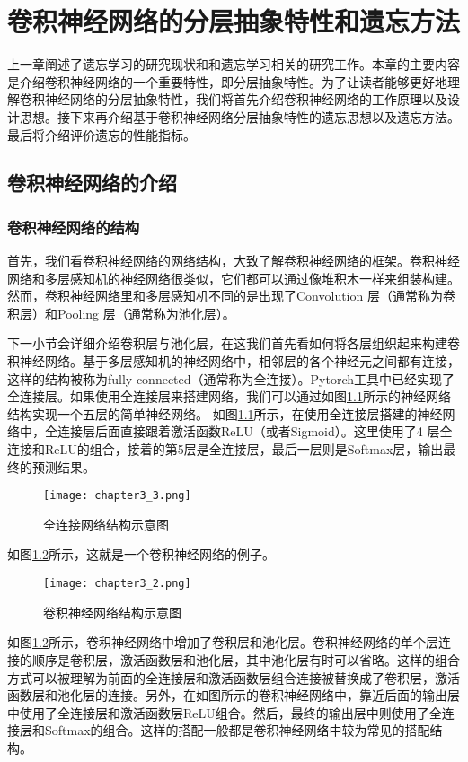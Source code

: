 
\chapter{卷积神经网络的分层抽象特性和遗忘方法}
上一章阐述了遗忘学习的研究现状和和遗忘学习相关的研究工作。本章的主要内容是介绍卷积神经网络的一个重要特性，即分层抽象特性。为了让读者能够更好地理解卷积神经网络的分层抽象特性，我们将首先介绍卷积神经网络的工作原理以及设计思想。接下来再介绍基于卷积神经网络分层抽象特性的遗忘思想以及遗忘方法。最后将介绍评价遗忘的性能指标。

\section{卷积神经网络的介绍}

\subsection{卷积神经网络的结构}

首先，我们看卷积神经网络的网络结构，大致了解卷积神经网络的框架。卷积神经网络和多层感知机的神经网络很类似，它们都可以通过像堆积木一样来组装构建。然而，卷积神经网络里和多层感知机不同的是出现了Convolution 层（通常称为卷积层）和Pooling 层（通常称为池化层）。

下一小节会详细介绍卷积层与池化层，在这我们首先看如何将各层组织起来构建卷积神经网络。基于多层感知机的神经网络中，相邻层的各个神经元之间都有连接，这样的结构被称为fully-connected（通常称为全连接）。Pytorch工具中已经实现了全连接层。如果使用全连接层来搭建网络，我们可以通过如图\ref{fig:chapter3_3}所示的神经网络结构实现一个五层的简单神经网络。
如图\ref{fig:chapter3_3}所示，在使用全连接层搭建的神经网络中，全连接层后面直接跟着激活函数ReLU（或者Sigmoid）。这里使用了4 层全连接和ReLU的组合，接着的第5层是全连接层，最后一层则是Softmax层，输出最终的预测结果。
\begin{figure}
    \centering
    \texttt{[image: chapter3\_3.png]}
    \caption{全连接网络结构示意图}
    \label{fig:chapter3_3}
\end{figure}
如图\ref{fig:chapter3_2}所示，这就是一个卷积神经网络的例子。
\begin{figure}
    \centering
    \texttt{[image: chapter3\_2.png]}
    \caption{卷积神经网络结构示意图}
    \label{fig:chapter3_2}
\end{figure}
如图\ref{fig:chapter3_2}所示，卷积神经网络中增加了卷积层和池化层。卷积神经网络的单个层连接的顺序是卷积层，激活函数层和池化层，其中池化层有时可以省略。这样的组合方式可以被理解为前面的全连接层和激活函数层组合连接被替换成了卷积层，激活函数层和池化层的连接。另外，在如图所示的卷积神经网络中，靠近后面的输出层中使用了全连接层和激活函数层ReLU组合。然后，最终的输出层中则使用了全连接层和Softmax的组合。这样的搭配一般都是卷积神经网络中较为常见的搭配结构。
